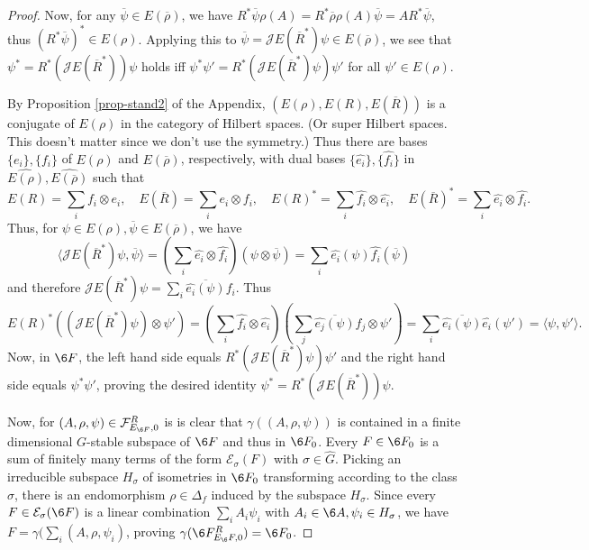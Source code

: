 \documentclass[11pt]{article}
\theoremstyle{definition}
\theoremstyle{definition}
\theoremstyle{remark}
\def\2#1{{\mathcal #1}}
\def\ol#1{{\overline #1}}
\begin{document}
\begin{proof}
Now, for any $\ol{\psi}\in E(\ol{\rho})$, we have
$R^*\ol{\psi}\rho(A)=R^*\ol{\rho}\rho(A)\ol{\psi}=AR^*\ol{\psi}$, 
thus $(R^*\ol{\psi})^*\in E(\rho)$. Applying this to
$\ol{\psi}=\2JE(\overline{R}^*)\psi\in E(\ol{\rho})$, we see that 
$\psi^*=R^*(\2JE(\overline{R}^*))\psi$ holds iff
$\psi^*\psi'=R^*(\2JE(\overline{R}^*)\psi)\psi'$ for all $\psi'\in E(\rho)$.

By Proposition \ref{prop-stand2} of the Appendix, $(E(\rho),E(R),E(\ol{R}))$ is a conjugate of
$E(\rho)$ in the category of Hilbert spaces. (Or super Hilbert spaces. This doesn't matter since we
don't use the symmetry.) Thus there are bases $\{e_i\},\{f_i\}$ of $E(\rho)$ and $E(\ol{\rho})$,
respectively, with dual bases $\{\widehat{e_i}\},\{\widehat{f_i}\}$ in
$\widehat{E(\rho)},\widehat{E(\ol{\rho})}$ such that  
\[ E(R) = \sum_i f_i\otimes e_i, \quad E(\ol{R})=\sum_i e_i\otimes f_i, \quad 
  E(R)^* = \sum_i \widehat{f_i}\otimes\widehat{e_i}, \quad E(\ol{R})^*=\sum_i\widehat{e_i}\otimes\widehat{f_i}.
\]
Thus, for $\psi\in E(\rho),\ol{\psi}\in E(\ol{\rho})$, we have
\[ \langle\2JE(\ol{R}^*)\psi,\ol{\psi}\rangle
   =\left(\sum_i\widehat{e_i}\otimes\widehat{f_i}\right)(\psi\otimes\ol{\psi})
   =\sum_i \widehat{e_i}(\psi)\widehat{f_i}(\ol{\psi})
\]
and therefore $\2JE(\ol{R}^*)\psi=\sum_i\overline{ {\widehat{e_i}(\psi)}} f_i$. Thus
\[ E(R)^*((\2JE(\ol{R}^*)\psi)\otimes\psi')=(\sum_i\widehat{f_i}\otimes\widehat{e_i})(
   \sum_j\ol{  {\widehat{e_j}(\psi)}}f_j\otimes\psi')=\sum_i\ol{ {\widehat{e_i}(\psi)}}\widehat{e_i}(\psi')
  =\langle\psi,\psi'\rangle.
\]
Now, in $\6F$, the left hand side equals $R^*(\2JE(\ol{R}^*)\psi)\psi'$ and the right hand side
equals $\psi^*\psi'$, proving the desired identity $\psi^*=R^*(\2JE(\overline{R}^*))\psi$.

Now, for $(A,\rho,\psi)\in \2F^R_{E_{\6F},0}$ is is clear that $\gamma((A,\rho,\psi))$ is contained
in a finite dimensional $G$-stable subspace of $\6F$ and thus in $\6F_0$. Every $F\in\6F_0$ is a sum
of finitely many terms of the form $\2E_\sigma(F)$ with $\sigma\in\widehat{G}$. Picking an
irreducible subspace $H_\sigma$ of isometries in $\6F_0$ transforming according to the class
$\sigma$, there is an endomorphism $\rho\in\Delta_f$ induced by the subspace $H_\sigma$. 
Since every $F\in \2E_\sigma(\6F)$ is a linear combination $\sum_i A_i\psi_i$ with 
$A_i\in\6A, \psi_i\in H_\sigma$, we have $F=\gamma(\sum_i(A,\rho,\psi_i)$, proving
$\gamma(\6F^R_{E_\6F,0})=\6F_0$. 


\end{proof}
\end{document}
